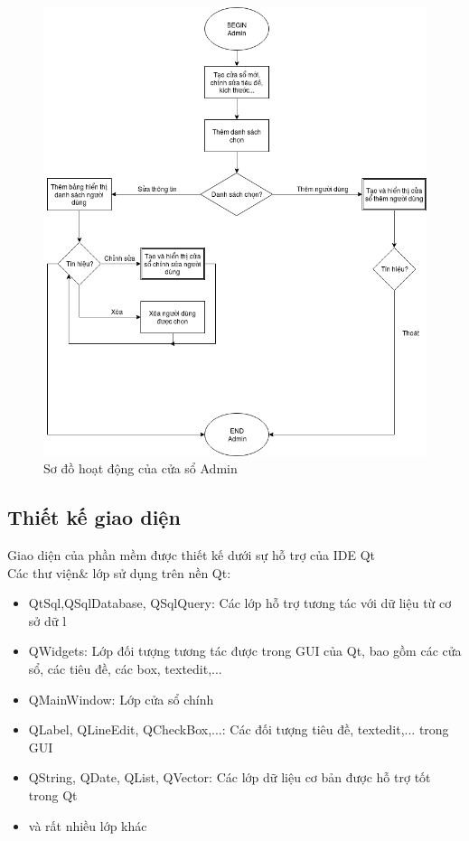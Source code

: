 \documentclass[a4paper]{article}
\begin{document}
\begin{figure}[h!]
	\begin{center}
		\includegraphics[scale=.5]{adminDiagram.png}
		\caption{Sơ đồ hoạt động của cửa sổ Admin}
	\end{center}
\end{figure}
	\newpage \newpage 
\subsection{Thiết kế giao diện}
Giao diện của phần mềm được thiết kế dưới sự hỗ trợ của IDE Qt\\
Các thư viện\& lớp sử dụng trên nền Qt:\\
\begin{itemize}
\item QtSql,QSqlDatabase, QSqlQuery: Các lớp hỗ trợ tương tác với dữ liệu từ cơ sở dữ l
\item QWidgets: Lớp đối tượng tương tác được trong GUI của Qt, bao gồm các cửa sổ, các tiêu đề, các box, textedit,...
\item QMainWindow: Lớp cửa sổ chính
\item QLabel, QLineEdit, QCheckBox,...: Các đối tượng tiêu đề, textedit,... trong GUI
\item QString, QDate, QList, QVector: Các lớp dữ liệu cơ bản được hỗ trợ tốt trong Qt
\item và rất nhiều lớp khác
\end{itemize}
\end{document}
